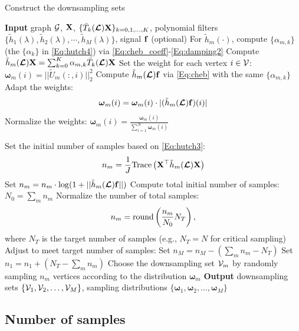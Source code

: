 \documentclass[journal, 10pt]{IEEEtran}
\begin{document}
\begin{algorithm}[tb]
\caption{Construct the downsampling sets}
\begin{algorithmic}
\State \textbf{Input} graph ${\mathcal{G}}$,  ${\bf X}$, $\{\bar{T}_k(\boldsymbol{\mathcal{L}}){\bf X}\}_{k=0,1,\ldots,K}$, polynomial filters $\{ \tilde{h}_1(\lambda), \tilde{h}_2(\lambda), \cdots, \tilde{h}_M(\lambda)\}$, signal ${\bf f}$ (optional)
\State For $\tilde{h}_m(\cdot)$, compute $\{\alpha_{m,k}\}$ (the $\{\alpha_k\}$ in \eqref{Eq:hutch4}) via \eqref{Eq:cheb_coeff}-\eqref{Eq:damping2}
\State Compute $\tilde{h}_m(\boldsymbol{\mathcal{L}}){\bf X}=\sum_{k=0}^K \alpha_{m,k}\bar{T}_k(\boldsymbol{\mathcal{L}}){\bf X}$
\State Set the weight for each vertex $i \in {\mathcal{V}}$: ${\boldsymbol \omega}_m(i) = ||\tilde{U}_m(:,i)||^2_2$
\State Compute $\tilde{h}_m(\boldsymbol{\mathcal{L}}){\bf f}$ via \eqref{Eq:cheb} with the same $\{\alpha_{m,k}\}$
\State Adapt the weights: $${\boldsymbol \omega}_m(i) = {\boldsymbol \omega}_m(i) \cdot |(\tilde{h}_m(\boldsymbol{\mathcal{L}}){\bf f})(i)|$$
\EndIf
\State Normalize the weights: ${\boldsymbol \omega}_m(i)=\frac{{\boldsymbol \omega}_m(i)}{\sum_{i=1}^N {\boldsymbol \omega}_m(i)}$

\State Set the initial number of samples based on \eqref{Eq:hutch3}: 
$$n_m = \frac{1}{J} \mathrm{Trace}\left({\bf X}^\top \tilde{h}_m(\boldsymbol{\mathcal{L}})\bf{X}\right)$$
\EndFor
{}
\State Set $n_m=n_m \cdot \log(1+||\tilde{h}_m(\boldsymbol{\mathcal{L}}){\bf f}||)$
\EndFor
\EndIf
\State Compute total initial number of samples: $N_0 = \sum_m n_m$
\State Normalize the number of total samples: $$n_m = \hbox{round}\left(\frac{n_m}{N_0}N_T\right),$$
where $N_T$ is the target number of samples (e.g., $N_T=N$ for critical sampling)
\EndFor
\State Adjust to meet target number of samples:  
\State Set $n_M = n_M - (\sum_m n_m -N_T)$
\State Set $n_1 = n_1 + (N_T-\sum_m n_m)$
\EndIf
\State Choose the downsampling set ${\mathcal{V}}_m$ by randomly sampling $n_m$ vertices according to the distribution ${\boldsymbol \omega}_m$
\EndFor
\State \textbf{Output} downsampling sets $\{{\mathcal{V}}_1,{\mathcal{V}}_2, \ldots, {\mathcal{V}}_M\}$, sampling distributions $\{{\boldsymbol \omega}_1,{\boldsymbol \omega}_2,\ldots,{\boldsymbol \omega}_M\}$
\end{algorithmic}
\label{Al:downsampling}
\end{algorithm}

\subsection{Number of samples}
\end{document}
